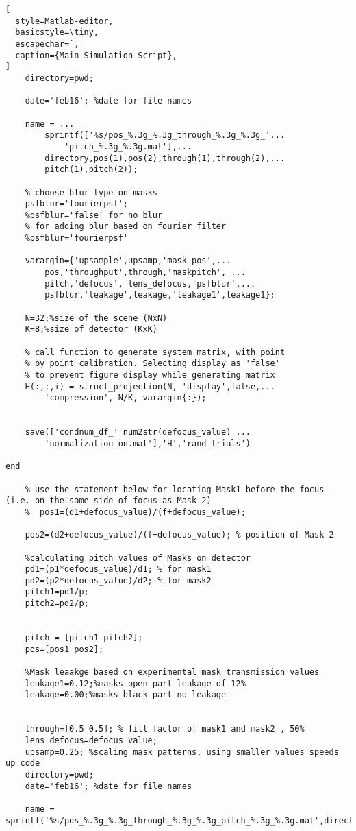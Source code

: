 \begin{lstlisting}[
  style=Matlab-editor,
  basicstyle=\tiny,
  escapechar=`,
  caption={Main Simulation Script},
]
    directory=pwd;
    
    date='feb16'; %date for file names
    
    name = ...
        sprintf(['%s/pos_%.3g_%.3g_through_%.3g_%.3g_'...
            'pitch_%.3g_%.3g.mat'],...
        directory,pos(1),pos(2),through(1),through(2),...
        pitch(1),pitch(2));
    
    % choose blur type on masks
    psfblur='fourierpsf';
    %psfblur='false' for no blur    
    % for adding blur based on fourier filter    
    %psfblur='fourierpsf' 
    
    varargin={'upsample',upsamp,'mask_pos',...
        pos,'throughput',through,'maskpitch', ...
        pitch,'defocus', lens_defocus,'psfblur',...
        psfblur,'leakage',leakage,'leakage1',leakage1};
    
    N=32;%size of the scene (NxN)
    K=8;%size of detector (KxK)
    
    % call function to generate system matrix, with point 
    % by point calibration. Selecting display as 'false' 
    % to prevent figure display while generating matrix
    H(:,:,i) = struct_projection(N, 'display',false,...
        'compression', N/K, varargin{:});
    

    save(['condnum_df_' num2str(defocus_value) ...
        'normalization_on.mat'],'H','rand_trials')
    
end

    % use the statement below for locating Mask1 before the focus (i.e. on the same side of focus as Mask 2)
    %  pos1=(d1+defocus_value)/(f+defocus_value);
    
    pos2=(d2+defocus_value)/(f+defocus_value); % position of Mask 2
    
    %calculating pitch values of Masks on detector
    pd1=(p1*defocus_value)/d1; % for mask1
    pd2=(p2*defocus_value)/d2; % for mask2
    pitch1=pd1/p;
    pitch2=pd2/p;
    
    
    pitch = [pitch1 pitch2];
    pos=[pos1 pos2];
    
    %Mask leaakge based on experimental mask transmission values
    leakage1=0.12;%masks open part leakage of 12%
    leakage=0.00;%masks black part no leakage
    
    
    through=[0.5 0.5]; % fill factor of mask1 and mask2 , 50%
    lens_defocus=defocus_value;
    upsamp=0.25; %scaling mask patterns, using smaller values speeds up code
    directory=pwd;
    date='feb16'; %date for file names
    
    name = sprintf('%s/pos_%.3g_%.3g_through_%.3g_%.3g_pitch_%.3g_%.3g.mat',directory,pos(1),pos(2),through(1),through(2),pitch(1),pitch(2));
    

\end{lstlisting}
